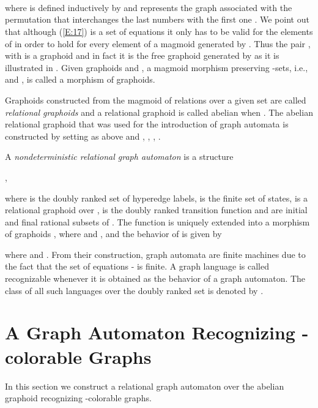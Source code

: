 \documentclass[runningheads,a4paper]{llncs}
\newcommand{\qq}{\qquad}
\newcommand{\bc}{\begin{center}}
\newcommand{\ec}{\end{center}}
\begin{document}
\begin{minipage}[b]{100pt}
  \end{minipage} \qq\quad  \begin{minipage}[b]{200pt}
\end{minipage}\\
\begin{minipage}[b]{340pt}

\end{minipage}\\ \\
where  is defined inductively by   and represents the graph associated with the permutation
that interchanges the last  numbers with the first one \cite{BK1}. We point out that although (\ref{E:17}) is a set of equations it only has to be valid for the elements of  in order to hold for every element of a magmoid generated by  \cite{BK1}.   Thus the pair , with  is a graphoid and in fact it is the free graphoid
generated by  as it is illustrated in \cite{BK3}. Given graphoids  and , a magmoid morphism  preserving -sets, i.e.,   and , is called a morphism of graphoids.

Graphoids constructed from the magmoid of relations  over a given set  are called \emph{relational graphoids} and a relational graphoid is called abelian when  . The abelian relational graphoid  that was used for the introduction of graph automata is constructed by setting  as above and
  ,
   ,
,
 .

A \emph{nondeterministic relational graph automaton} is a structure
\bc
,
\ec
where  is the doubly ranked set of hyperedge labels,      is the finite set of states,    is a relational graphoid over ,      is the doubly ranked transition function and   are initial and final rational subsets of
. The function  is uniquely extended into a morphism of graphoids
, where  and ,
and the behavior of  is given by

where  and
. From their construction, graph automata are
finite machines due to the fact that the set of equations
- is finite.
A graph language is called recognizable whenever it is obtained as
the behavior of a graph automaton. The class of all such languages
over the doubly ranked set  is denoted by
 .


\section{A Graph Automaton Recognizing -colorable Graphs}\label{S:4}

In this section we construct a relational graph automaton over the abelian graphoid  recognizing -colorable graphs.
\end{document}
